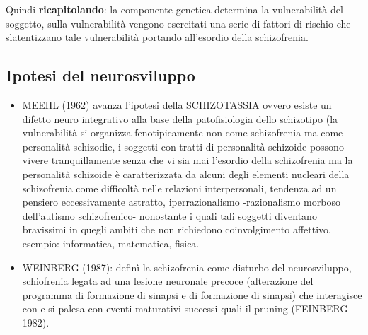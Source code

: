 Quindi \textbf{ricapitolando}: la componente genetica determina la
vulnerabilità del soggetto, sulla vulnerabilità vengono esercitati una
serie di fattori di rischio che slatentizzano tale vulnerabilità
portando all'esordio della schizofrenia.

\subsection{Ipotesi del neurosviluppo}

\begin{itemize}
\item
  MEEHL (1962) avanza l'ipotesi della SCHIZOTASSIA ovvero esiste un
  difetto neuro integrativo alla base della patofisiologia dello
  schizotipo (la vulnerabilità si organizza fenotipicamente non come
  schizofrenia ma come personalità schizodie, i soggetti con tratti di
  personalità schizoide possono vivere tranquillamente senza che vi sia
  mai l'esordio della schizofrenia ma la personalità schizoide è
  caratterizzata da alcuni degli elementi nucleari della schizofrenia
  come difficoltà nelle relazioni interpersonali, tendenza ad un
  pensiero eccessivamente astratto, iperrazionalismo -razionalismo
  morboso dell'autismo schizofrenico- nonostante i quali tali soggetti
  diventano bravissimi in quegli ambiti che non richiedono
  coinvolgimento affettivo, esempio: informatica, matematica, fisica.
\item
  WEINBERG (1987): definì la schizofrenia come disturbo del
  neurosviluppo, schiofrenia legata ad una lesione neuronale precoce
  (alterazione del programma di formazione di sinapsi e di formazione di
  sinapsi) che interagisce con e si palesa con eventi maturativi
  successi quali il pruning (FEINBERG 1982).
\end{itemize}

